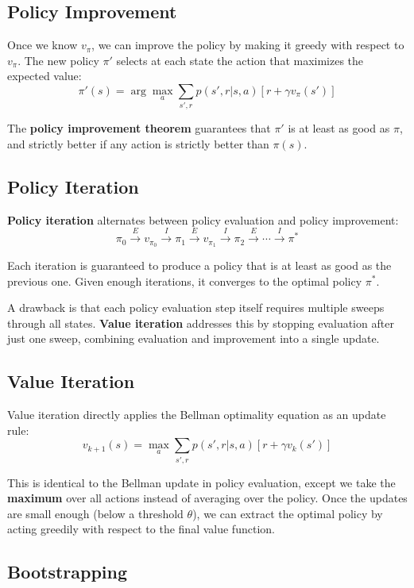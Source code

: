 \documentclass[11pt,a4paper]{article}
\begin{document}
\subsection{Policy Improvement}

Once we know $v_\pi$, we can improve the policy by making it greedy with respect to $v_\pi$. The new policy $\pi'$ selects at each state the action that maximizes the expected value:
\[
\pi'(s) = \arg\max_a \sum_{s', r} p(s', r | s, a)[r + \gamma v_\pi(s')]
\]

The \textbf{policy improvement theorem} guarantees that $\pi'$ is at least as good as $\pi$, and strictly better if any action is strictly better than $\pi(s)$.

\subsection{Policy Iteration}

\textbf{Policy iteration} alternates between policy evaluation and policy improvement:
\[
\pi_0 \xrightarrow{E} v_{\pi_0} \xrightarrow{I} \pi_1 \xrightarrow{E} v_{\pi_1} \xrightarrow{I} \pi_2 \xrightarrow{E} \cdots \xrightarrow{I} \pi^*
\]

Each iteration is guaranteed to produce a policy that is at least as good as the previous one. Given enough iterations, it converges to the optimal policy $\pi^*$.

A drawback is that each policy evaluation step itself requires multiple sweeps through all states. \textbf{Value iteration} addresses this by stopping evaluation after just one sweep, combining evaluation and improvement into a single update.

\subsection{Value Iteration}

Value iteration directly applies the Bellman optimality equation as an update rule:
\[
v_{k+1}(s) = \max_a \sum_{s', r} p(s', r | s, a)[r + \gamma v_k(s')]
\]

This is identical to the Bellman update in policy evaluation, except we take the \textbf{maximum} over all actions instead of averaging over the policy. Once the updates are small enough (below a threshold $\theta$), we can extract the optimal policy by acting greedily with respect to the final value function.

\subsection{Bootstrapping}
\end{document}
